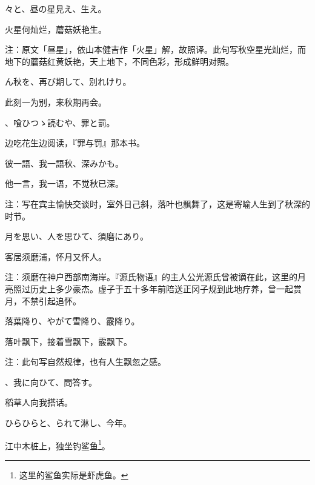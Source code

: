 \begin{haiku}
    {\FH {}々と、昼の星見え、生え。}

    {\FK 火星何灿烂，蘑菇妖艳生。}

    {\FT 注：原文「昼星」，依山本健吉作「火星」解，故照译。此句写秋空星光灿烂，而地下的蘑菇红黄妖艳，天上地下，不同色彩，形成鲜明对照。}
\end{haiku}

\begin{haiku}
    {\FH {}ん秋を、再び期して、別れけり。}

    {\FK 此刻一为别，来秋期再会。}
\end{haiku}

\begin{haiku}
    {\FH {}、喰ひつゝ読むや、罪と罰。}

    {\FK 边吃花生边阅读，『罪与罚』那本书。}
\end{haiku}

\begin{haiku}
    {\FH 彼一語、我一語秋、深みかも。}

    {\FK 他一言，我一语，不觉秋已深。}

    {\FT 注：写在宾主愉快交谈时，室外日己斜，落叶也飘舞了，这是寄喻人生到了秋深的时节。}
\end{haiku}

\begin{haiku}
    {\FH 月を思い、人を思ひて、須磨にあり。}

    {\FK 客居须磨浦，怀月又怀人。}

    {\FT 注：须磨在神户西部南海岸。『源氏物语』的主人公光源氏曾被谪在此，这里的月亮照过历史上多少豪杰。虚子于五十多年前陪送正冈子规到此地疗养，曾一起赏月，不禁引起追怀。}
\end{haiku}

\begin{haiku}
    {\FH 落葉降り、やがて雪降り、霰降り。}

    {\FK 落叶飘下，接着雪飘下，霰飘下。}

    {\FT 注：此句写自然规律，也有人生飘忽之感。}
\end{haiku}

\begin{haiku}
    {\FH {}、我に向ひて、問答す。}

    {\FK 稻草人向我搭话。}
\end{haiku}

\begin{haiku}
    {\FH ひらひらと、られて淋し、今年。}

    {\FK 江中木桩上，独坐钓鲨鱼\footnote{\FT 这里的鲨鱼实际是虾虎鱼。}。}
\end{haiku}

